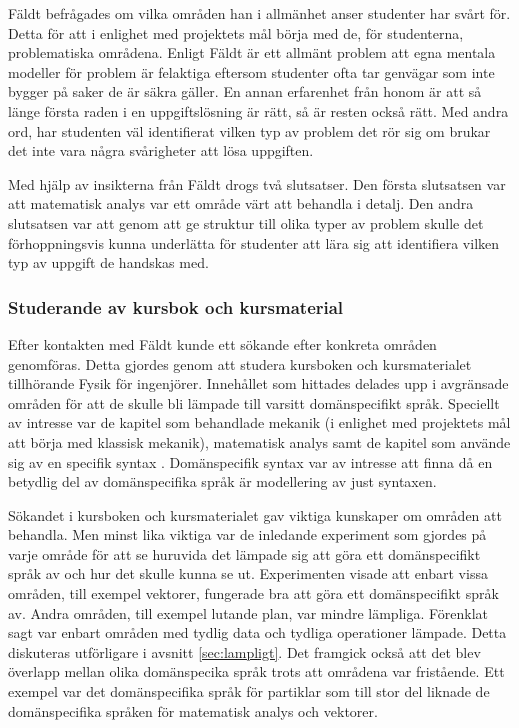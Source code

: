 \begin{draft}
Fäldt befrågades om vilka områden han i allmänhet anser studenter har
svårt för. Detta för att i enlighet med projektets mål börja med de, för
studenterna, problematiska områdena. Enligt Fäldt är ett allmänt problem att
egna mentala modeller för problem är felaktiga eftersom studenter ofta tar
genvägar som inte bygger på saker de är säkra gäller. En annan erfarenhet
från honom är att så länge första raden i en uppgiftslösning är rätt, så är
resten också rätt. Med andra ord, har studenten väl identifierat vilken typ av
problem det rör sig om brukar det inte vara några svårigheter att lösa
uppgiften.

Med hjälp av insikterna från Fäldt drogs två slutsatser. Den första slutsatsen
var att matematisk analys var ett område värt att behandla i detalj. Den andra
slutsatsen var att genom att ge struktur till olika typer av problem skulle det
förhoppningsvis kunna underlätta för studenter att lära sig att identifiera vilken
typ av uppgift de handskas med.

\subsubsection*{Studerande av kursbok och kursmaterial}

Efter kontakten med Fäldt kunde ett sökande efter konkreta områden genomföras. Detta gjordes genom att studera kursboken och kursmaterialet tillhörande Fysik för ingenjörer. Innehållet som hittades delades upp i avgränsade områden för att de skulle bli lämpade till varsitt domänspecifikt språk. Speciellt av intresse var de kapitel som behandlade mekanik (i enlighet med projektets mål att börja med klassisk mekanik), matematisk analys samt de kapitel som använde sig av en specifik syntax . Domänspecifik syntax var av intresse att finna då en betydlig del av domänspecifika språk är modellering av just syntaxen. 

Sökandet i kursboken och kursmaterialet gav viktiga kunskaper om områden att behandla. Men minst lika viktiga var de inledande experiment som gjordes på varje område för att se huruvida det lämpade sig att göra ett domänspecifikt språk av och hur det skulle kunna se ut. Experimenten visade att enbart vissa områden, till exempel vektorer, fungerade bra att göra ett domänspecifikt språk av. Andra områden, till exempel lutande plan, var mindre lämpliga. Förenklat sagt var enbart områden med tydlig data och tydliga operationer lämpade. Detta diskuteras utförligare i avsnitt \ref{sec:lampligt}. Det framgick också att det blev överlapp mellan olika domänspecika språk trots att områdena var fristående. Ett exempel var det domänspecifika språk för partiklar som till stor del liknade de domänspecifika språken för matematisk analys och vektorer.


\end{draft}
